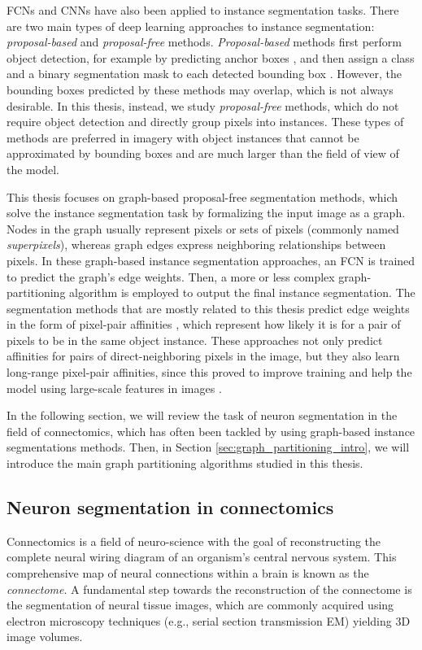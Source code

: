 FCNs and CNNs have also been applied to instance segmentation tasks.
There are two main types of deep learning approaches to instance segmentation: \emph{proposal-based} and \emph{proposal-free} methods. 
\emph{Proposal-based} methods first perform object detection, for example by predicting anchor boxes \cite{ren2015faster}, and then assign a class and a binary segmentation mask to each detected bounding box \cite{he2017mask,porzi2019seamless}.
However, the bounding boxes predicted by these methods may overlap, which is not always desirable. 
In this thesis, instead, we study \emph{proposal-free} methods, which do not require object detection and directly group pixels into instances. 
These types of methods are preferred in imagery with object instances that cannot be approximated by bounding boxes and are much larger than the field of view of the model. 

This thesis focuses on graph-based proposal-free segmentation methods, which solve the instance segmentation task by formalizing the input image as a graph. Nodes in the graph usually represent pixels or sets of pixels (commonly named \emph{superpixels}), whereas graph edges express neighboring relationships between pixels. In these graph-based instance segmentation approaches, an FCN is trained to predict the graph's edge weights. Then, a more or less complex graph-partitioning algorithm is employed to output the final instance segmentation. 
The segmentation methods that are mostly related to this thesis predict edge weights in the form of pixel-pair affinities \cite{Gao_2019_ICCV,liu2018affinity,lee2017superhuman}, which represent how likely it is for a pair of pixels to be in the same object instance. These approaches not only predict affinities for pairs of direct-neighboring pixels in the image, but they also learn long-range pixel-pair affinities, since this proved to improve training and help the model using large-scale features in images \cite{lee2017superhuman}.

In the following section, we will review the task of neuron segmentation in the field of connectomics, which has often been tackled by using graph-based instance segmentations methods. Then, in Section \ref{sec:graph_partitioning_intro}, we will introduce the main graph partitioning algorithms studied in this thesis.



 
\subsection{Neuron segmentation in connectomics}
Connectomics is a field of neuro-science with the goal of reconstructing the complete neural wiring diagram of an organism's central nervous system. This comprehensive map of neural connections within a brain is known as the \emph{connectome}. A fundamental step towards the reconstruction of the connectome is the segmentation of neural tissue images, which are commonly acquired using electron microscopy techniques (e.g., serial section transmission EM) yielding 3D image volumes. 


